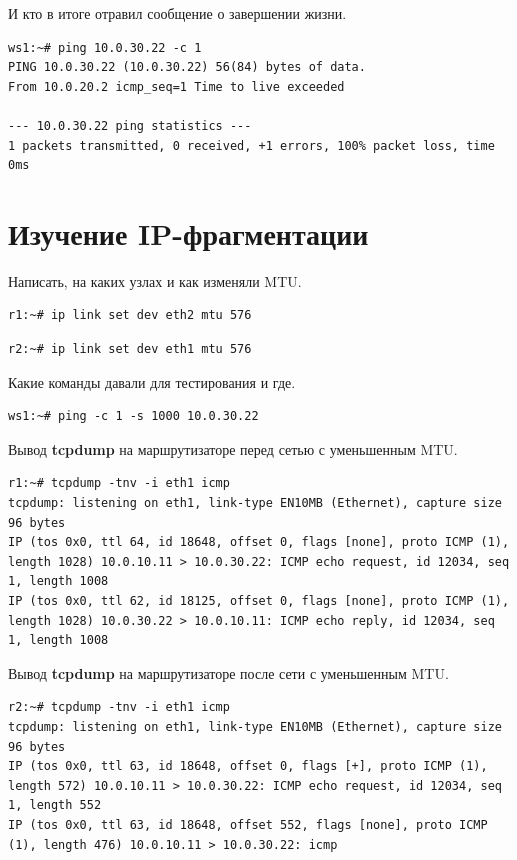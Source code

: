 \documentclass[a4paper,12pt]{article}
\begin{document}
И кто в итоге отравил сообщение о завершении жизни.
\begin{Verbatim}
ws1:~# ping 10.0.30.22 -c 1
PING 10.0.30.22 (10.0.30.22) 56(84) bytes of data.
From 10.0.20.2 icmp_seq=1 Time to live exceeded

--- 10.0.30.22 ping statistics ---
1 packets transmitted, 0 received, +1 errors, 100% packet loss, time 0ms
\end{Verbatim}


\section{Изучение IP-фрагментации}

Написать, на каких узлах и как изменяли MTU.


\begin{Verbatim}
r1:~# ip link set dev eth2 mtu 576
\end{Verbatim}

\begin{Verbatim}
r2:~# ip link set dev eth1 mtu 576
\end{Verbatim}


Какие команды давали для тестирования и где.

\begin{Verbatim}
ws1:~# ping -c 1 -s 1000 10.0.30.22
\end{Verbatim}

Вывод \textbf{tcpdump} на маршрутизаторе перед сетью с уменьшенным MTU.


\begin{Verbatim}
r1:~# tcpdump -tnv -i eth1 icmp 
tcpdump: listening on eth1, link-type EN10MB (Ethernet), capture size 96 bytes
IP (tos 0x0, ttl 64, id 18648, offset 0, flags [none], proto ICMP (1), length 1028) 10.0.10.11 > 10.0.30.22: ICMP echo request, id 12034, seq 1, length 1008
IP (tos 0x0, ttl 62, id 18125, offset 0, flags [none], proto ICMP (1), length 1028) 10.0.30.22 > 10.0.10.11: ICMP echo reply, id 12034, seq 1, length 1008
\end{Verbatim}

Вывод \textbf{tcpdump} на маршрутизаторе после сети с уменьшенным MTU.


\begin{Verbatim}
r2:~# tcpdump -tnv -i eth1 icmp
tcpdump: listening on eth1, link-type EN10MB (Ethernet), capture size 96 bytes
IP (tos 0x0, ttl 63, id 18648, offset 0, flags [+], proto ICMP (1), length 572) 10.0.10.11 > 10.0.30.22: ICMP echo request, id 12034, seq 1, length 552
IP (tos 0x0, ttl 63, id 18648, offset 552, flags [none], proto ICMP (1), length 476) 10.0.10.11 > 10.0.30.22: icmp
\end{Verbatim}
\end{document}
